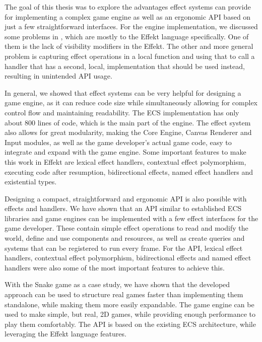 \label{chap:conclusion}

The goal of this thesis was to explore the advantages effect systems can provide for implementing a complex game engine as well as an ergonomic API based on just a few straightforward interfaces. For the engine implementation, we discussed some problems in , which are mostly to the Effekt language specifically. One of them is the lack of visibility modifiers in the Effekt. The other and more general problem is capturing effect operations in a local function and using that to call a handler that has a second, local, implementation that should be used instead, resulting in unintended API usage.

In general, we showed that effect systems can be very helpful for designing a game engine, as it can reduce code size while simultaneously allowing for complex control flow and maintaining readability. The ECS implementation has only about 800 lines of code, which is the main part of the engine. The effect system also allows for great modularity, making the Core Engine, Canvas Renderer and Input modules, as well as the game developer's actual game code, easy to integrate and expand with the game engine. Some important features to make this work in Effekt are lexical effect handlers, contextual effect polymorphism, executing code after resumption, bidirectional effects, named effect handlers and existential types.

Designing a compact, straightforward and ergonomic API is also possible with effects and handlers. We have shown that an API similar to established ECS libraries and game engines can be implemented with a few effect interfaces for the game developer. These contain simple effect operations to read and modify the world, define and use components and resources, as well as create queries and systems that can be registered to run every frame. For the API, lexical effect handlers, contextual effect polymorphism, bidirectional effects and named effect handlers were also some of the most important features to achieve this.

With the Snake game as a case study, we have shown that the developed approach can be used to structure real games faster than implementing them standalone, while making them more easily expandable. The game engine can be used to make simple, but real, 2D games, while providing enough performance to play them comfortably. The API is based on the existing ECS architecture, while leveraging the Effekt language features.

